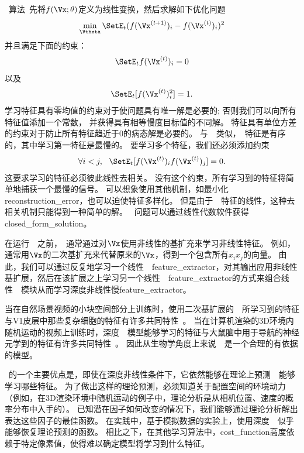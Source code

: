 ~算法~\citep{WisSej2002}先将$f(\Vx;\theta)$定义为线性变换，然后求解如下优化问题
\begin{align}
	\label{eqn:138}
	\min_{\Vtheta} \SetE_t  (f(\Vx^{(t+1)})_i - f(\Vx^{(t)})_i  )^2
\end{align}
并且满足下面的约束：
\begin{align}
	\label{eqn:139}
	\SetE_t  f(\Vx^{(t)})_i = 0 
\end{align}
以及
\begin{align}
	\label{eqn:1310}
	\SetE_t [ f(\Vx^{(t)})_i^2 ] =1. 
\end{align} %
学习特征具有零均值的约束对于使问题具有唯一解是必要的; 
否则我们可以向所有特征值添加一个常数，
并获得具有相等慢度目标值的不同解。
特征具有单位方差的约束对于防止所有特征趋近于$0$的病态解是必要的。
与~~类似，~特征是有序的，其中学习第一特征是最慢的。
要学习多个特征，我们还必须添加约束
\begin{align}
\label{eqn:1311}
\forall i<j,\ \  \SetE_t [f(\Vx^{(t)})_i  f(\Vx^{(t)})_j] = 0.
\end{align}
这要求学习的特征必须彼此线性去相关。 
没有这个约束，所有学习到的特征将简单地捕获一个最慢的信号。
可以想象使用其他机制，如最小化\gls{reconstruction_error}，也可以迫使特征多样化。
但是由于~~特征的线性，这种去相关机制只能得到一种简单的解。 
~问题可以通过线性代数软件获得\gls{closed_form_solution}。



在运行~~之前，~通常通过对$\Vx$使用非线性的基扩充来学习非线性特征。
例如，通常用$\Vx$的二次基扩充来代替原来的$\Vx$，得到一个包含所有$x_ix_j$的向量。
由此，我们可以通过反复地学习一个线性~~\gls{feature_extractor}，对其输出应用非线性基扩展，然后在该扩展之上学习另一个线性~~\gls{feature_extractor}的方式来组合线性~~模块从而学习深度非线性慢\gls{feature_extractor}。



当在自然场景视频的小块空间部分上训练时，使用二次基扩展的~~所学习到的特征与V1皮层中那些复杂细胞的特征有许多共同特性~\citep{Berkes-Wiskott-2005}。
当在计算机渲染的3D环境内随机运动的视频上训练时，深度~~模型能够学习的特征与大鼠脑中用于导航的神经元学到的特征有许多共同特性~\citep{franzius2007slowness}。
因此从生物学角度上来说~~是一个合理的有依据的模型。



~的一个主要优点是，即使在深度非线性条件下，它依然能够在理论上预测~~能够学习哪些特征。
为了做出这样的理论预测，必须知道关于配置空间的环境动力（例如，在3D渲染环境中随机运动的例子中，理论分析是从相机位置、速度的概率分布中入手的）。
已知潜在因子如何改变的情况下，我们能够通过理论分析解出表达这些因子的最佳函数。
在实践中，基于模拟数据的实验上，使用深度~~似乎能够恢复理论预测的函数。
相比之下，在其他学习算法中，\gls{cost_function}高度依赖于特定像素值，使得难以确定模型将学习到什么特征。


